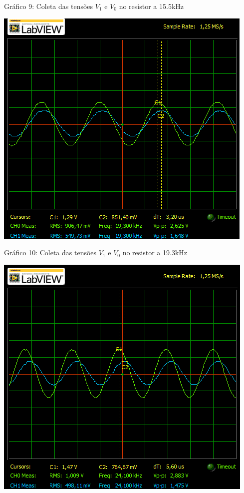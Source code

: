 \documentclass[a4 paper]{article}
\begin{document}
\begin{center}
Gráfico 9: Coleta das tensões $V_1$ e $V_0$ no resistor a 15.5kHz
\end{center}

\begin{table}[h]
\centering
\includegraphics[scale=0.7]{graficos/circ2/rgadicoa2-2-19_3}
\end{table}

\begin{center}
Gráfico 10: Coleta das tensões $V_1$ e $V_0$ no resistor a 19.3kHz
\end{center}

\newpage
\begin{table}[h]
\centering
\includegraphics[scale=0.7]{graficos/circ2/rgadicoa2-2-24_1}
\end{table}
\end{document}
